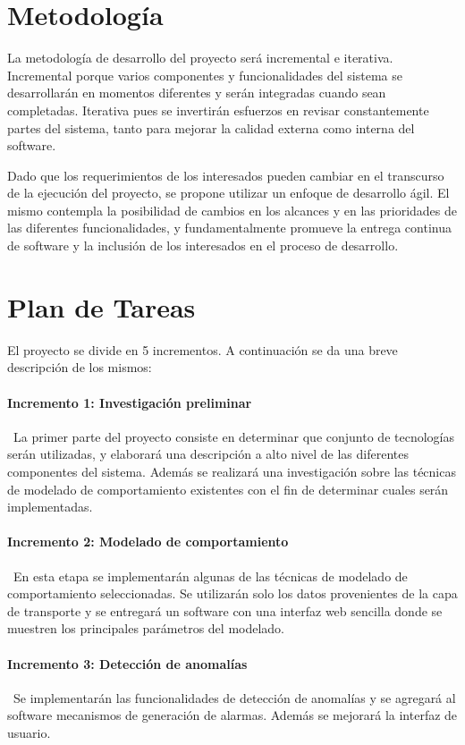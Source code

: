 \section*{Metodología}

La metodología de desarrollo del proyecto será incremental e iterativa. Incremental porque varios componentes y funcionalidades del sistema se desarrollarán en momentos diferentes y serán integradas cuando sean completadas. Iterativa pues se invertirán esfuerzos en revisar constantemente partes del sistema, tanto para mejorar la calidad externa como interna del software\cite{ISOIEC9126}.

Dado que los requerimientos de los interesados pueden cambiar en el transcurso de la ejecución del proyecto, se propone utilizar un enfoque de desarrollo ágil. El mismo contempla la posibilidad de cambios en los alcances y en las prioridades de las diferentes funcionalidades, y fundamentalmente promueve la entrega continua de software y la inclusión de los interesados en el proceso de desarrollo.

\section*{Plan de Tareas}

El proyecto se divide en 5 incrementos. A continuación se da una breve descripción de los mismos:

\paragraph{Incremento 1: Investigación preliminar}\
La primer parte del proyecto consiste en determinar que conjunto de tecnologías serán utilizadas, y elaborará una descripción a alto nivel de las diferentes componentes del sistema. Además se realizará una investigación sobre las técnicas de modelado de comportamiento existentes con el fin de determinar cuales serán implementadas.
\paragraph{Incremento 2: Modelado de comportamiento} \
En esta etapa se implementarán algunas de las técnicas de modelado de comportamiento seleccionadas. Se utilizarán solo los datos provenientes de la capa de transporte y se entregará un software con una interfaz web sencilla donde se muestren los principales parámetros del modelado.
\paragraph{Incremento 3: Detección de anomalías} \
Se implementarán las funcionalidades de detección de anomalías y se agregará al software mecanismos de generación de alarmas. Además se mejorará la interfaz de usuario.
